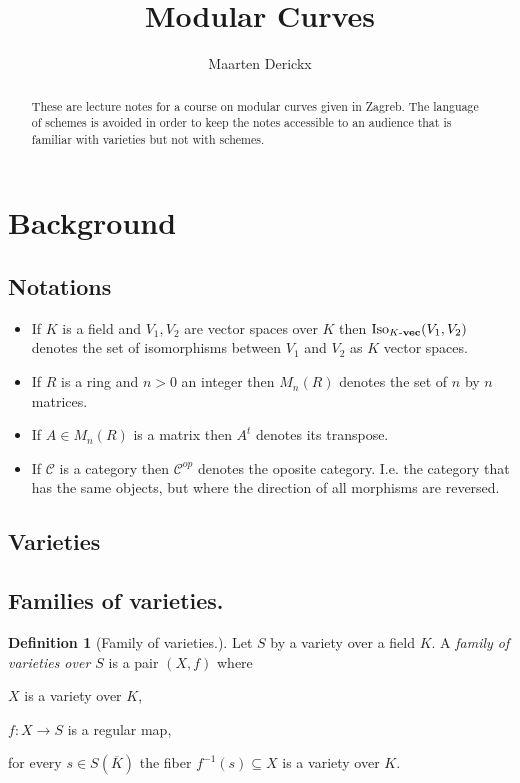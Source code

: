 \documentclass[a4paper,12pt,reqno]{amsart}
\title{Modular Curves}
\author{Maarten Derickx}
\newcommand{\IsoKVec}[1]{\mathrm{Iso}_{#1 {\bf\text{-}vec}}}
\newcommand{\transpose}{t}
\theoremstyle{definition}
\newtheorem{definition}[lemma]{Definition}
\numberwithin{lemma}{section}
\numberwithin{equation}{section}
\numberwithin{figure}{section}
\begin{document}
\begin{abstract}
These are lecture notes for a course on modular curves given in Zagreb. The language of schemes is avoided in order to keep the notes accessible to an audience that is familiar with varieties but not with schemes.
\end{abstract}

\maketitle
\setcounter{tocdepth}{3}
\tableofcontents

\section{Background}


\subsection{Notations}

\begin{itemize}
	\item If $K$ is a field and $V_1,V_2$ are vector spaces over $K$ then $\IsoKVec{K}(V_1,V_2)$ denotes the set of isomorphisms between $V_1$ and $V_2$ as $K$ vector spaces.
	\item If $R$ is a ring and $n >0 $ an integer then $M_n(R)$ denotes the set of $n$ by $n$ matrices.
	\item If $A \in M_n(R)$ is a matrix then $A^\transpose$ denotes its transpose. 
	\item If $\mathcal C$ is a category then $\mathcal C^{op}$ denotes the oposite category. I.e. the  category that has the same objects, but where the direction of all morphisms are reversed.
\end{itemize}

\newpage
\subsection{Varieties}



\hspace{1em}

\subsection{Families of varieties.}
\begin{definition}[Family of varieties.]\label{def:family-of-varieties}
Let $S$ by a variety over a field $K$. A \textit{family of varieties over $S$} is a pair $(X,f)$ where 
\begin{defenum}
	\item $X$ is a variety over $K$,
	\item $f: X \to S$ is a regular map,
	\item for every $s \in S(\overline K)$ the fiber $f^{-1}(s) \subseteq X$ is a variety over $K$. \label{def:family-of-varieties-fibers}
\end{defenum}
\end{definition}
\end{document}
